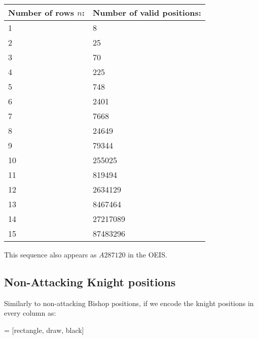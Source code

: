\documentclass[12pt]{report}
\begin{document}
{{\begin{center}
\begin{tabular}{ |p{3cm}|p{3cm}|  }
 \hline
 Number of rows 	$n$: & Number of valid positions: \\
 \hline
 1 & 8   \\
 2 &   25  \\
 3 & 70 \\
 4 & 225 \\
 5 &   748  \\
 6 & 2401  \\
 7 & 7668  \\
 8 & 24649  \\
 9 & 79344  \\
 10 & 255025  \\
 11 & 819494  \\
 12 & 2634129  \\
 13 & 8467464  \\
 14 & 27217089  \\
 15 & 87483296  \\
 \hline
\end{tabular}
\end{center}

\noindent This sequence also appears as $A287120$ in the OEIS. \cite{S2015}









\subsection{Non-Attacking Knight positions}

Similarly to non-attacking Bishop positions, if we encode the knight positions in every column as:

\tikzset{node distance = 0.55cm and 2cm}
 = [rectangle, draw, black]

\begin{figure}[ht]
        \centering
        \begin{subfigure}[b]{0.1\textwidth}
                \centering

\end{subfigure}\begin{subfigure}[b]{0.1\textwidth}
        	\centering


\end{subfigure}
\end{figure}}}
\end{document}
